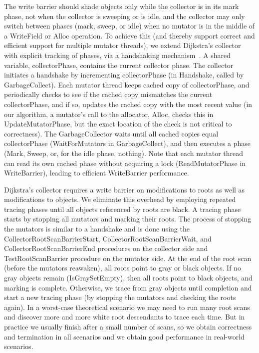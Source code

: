 The write barrier should shade objects only while the collector is in its mark phase,
not when the collector is sweeping or is idle, and the collector may only switch between phases (mark, sweep, or idle)
when no mutator is in the middle of a WriteField or Alloc operation.
To achieve this (and thereby support correct and efficient support for multiple mutator threads),
we extend Dijkstra's collector with explicit tracking of phases, via a handshaking mechanism~\cite{doli93,doli94}.
A shared variable, collectorPhase, contains the current collector phase.
The collector initiates a handshake by incrementing collectorPhase (in Handshake, called by GarbageCollect).
Each mutator thread keeps cached copy of collectorPhase, and periodically checks to see if
the cached copy mismatches the current collectorPhase, and if so, updates the cached copy
with the most recent value
(in our algorithm, a mutator's call to the allocator, Alloc, checks this in UpdateMutatorPhase,
but the exact location of the check is not critical to correctness).
The GarbageCollector waits until all cached copies equal collectorPhase (WaitForMutators in GarbageCollect),
and then executes a phase (Mark, Sweep, or, for the idle phase, nothing).
Note that each mutator thread can read its own cached phase without acquiring a lock (ReadMutatorPhase in WriteBarrier),
leading to efficient WriteBarrier performance.

Dijkstra's collector requires a write barrier on modifications to roots as well as modifications to objects. 
We eliminate this overhead by employing repeated tracing 
phases until all objects referenced by roots are black. 
A tracing phase starts by stopping all mutators and marking their roots. 
The process of stopping the mutators is similar to a handshake and is done using the CollectorRootScanBarrierStart, CollectorRootScanBarrierWait, and CollectorRootScanBarrierEnd procedures on the collector side and TestRootScanBarrier procedure on the mutator side. 
At the end of the root scan (before the mutators reawaken), all roots point to gray or black objects.
If no gray objects remain (IsGraySetEmpty), then all roots point to black objects, and marking is complete. 
Otherwise, we trace from gray objects until completion and start a new
tracing phase (by stopping the mutators and checking the roots again). 
In a worst-case theoretical scenario we may need to run many root scans and discover more and more white root descendants to trace each time. 
But in practice we usually finish after a small number of scans,
so we obtain correctness and termination in all scenarios and we obtain good performance in real-world scenarios. 




